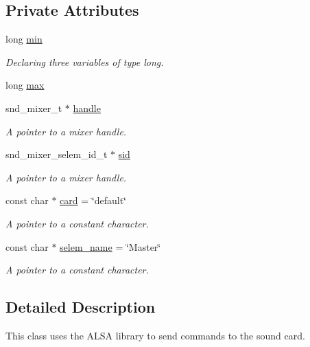 \subsection*{Private Attributes}
\begin{DoxyCompactItemize}
\item 
long \hyperlink{class_ubuntu_controller_1_1_volume_control_afb2eadbc45958c7e434dbb3ad8a0b58f}{min}
\begin{DoxyCompactList}\small\item\em Declaring three variables of type long. \end{DoxyCompactList}\item 
long \hyperlink{class_ubuntu_controller_1_1_volume_control_a424cc9577c9e8be471b3859b015b5243}{max}
\item 
snd\+\_\+mixer\+\_\+t $\ast$ \hyperlink{class_ubuntu_controller_1_1_volume_control_afc2d041659325e8ede7d9d600408c7e2}{handle}
\begin{DoxyCompactList}\small\item\em A pointer to a mixer handle. \end{DoxyCompactList}\item 
snd\+\_\+mixer\+\_\+selem\+\_\+id\+\_\+t $\ast$ \hyperlink{class_ubuntu_controller_1_1_volume_control_a129acd7b00686987ce7631110b283751}{sid}
\begin{DoxyCompactList}\small\item\em A pointer to a mixer handle. \end{DoxyCompactList}\item 
const char $\ast$ \hyperlink{class_ubuntu_controller_1_1_volume_control_a2ce0158fa17926a0a06d254fa61c1024}{card} = \char`\"{}default\char`\"{}
\begin{DoxyCompactList}\small\item\em A pointer to a constant character. \end{DoxyCompactList}\item 
const char $\ast$ \hyperlink{class_ubuntu_controller_1_1_volume_control_ac5cf75a6cc7f43829220bb6c39e63215}{selem\+\_\+name} = \char`\"{}Master\char`\"{}
\begin{DoxyCompactList}\small\item\em A pointer to a constant character. \end{DoxyCompactList}\end{DoxyCompactItemize}


\subsection{Detailed Description}
This class uses the A\+L\+SA library to send commands to the sound card. 

